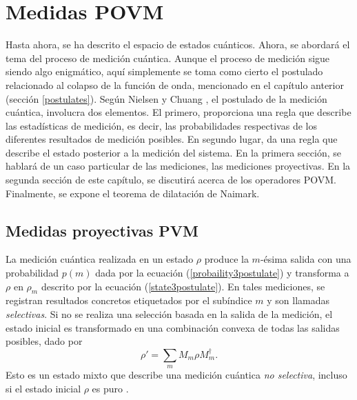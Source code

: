 \chapter{Medidas POVM}\label{MedidaPOVM}
Hasta ahora, se ha descrito el espacio de estados cuánticos. Ahora, se abordará
el tema del proceso de medición cuántica. Aunque el proceso de medición  sigue
siendo algo enigmático, aquí simplemente se toma como cierto el
postulado relacionado al colapso de la función de onda, mencionado en el capítulo
anterior (sección {\ref{postulates}}). Según Nielsen y Chuang
{\cite{nielsen_chuang_2010}}, el postulado de la medición cuántica, involucra
dos elementos. El primero, proporciona una regla que describe las estadísticas
de medición, es decir, las probabilidades respectivas de los diferentes
resultados de medición posibles. En segundo lugar, da una regla que describe el
estado posterior a la medición del sistema.  En la primera sección, se hablará
de un caso particular de las mediciones, las mediciones proyectivas. En la
segunda sección de este capítulo, se discutirá acerca de los operadores POVM\@.
Finalmente, se expone el teorema de dilatación de
Naimark. 

\section{Medidas proyectivas PVM} %
La medición cuántica realizada en un estado $\rho$ produce  la $m$-ésima 
salida con una probabilidad $p(m)$ dada por la ecuación
(\ref{probaility3postulate}) y transforma a $\rho $ en $\rho_m$ descrito por la
ecuación (\ref{state3postulate}). En tales mediciones, se registran resultados
concretos etiquetados por el subíndice $m$ y son llamadas \textit{selectivas}.
Si no se realiza una selección basada en la salida de la medición, el estado
inicial es transformado en una combinación convexa de todas las salidas
posibles, dado por 
\begin{equation}\label{non-selective-measure}
	\rho'=\sum_m M_m\rho M_m^\dagger.
\end{equation}
Esto es un estado mixto que  describe una medición cuántica \textit{no selectiva}, incluso si el estado inicial $\rho$ es puro {\cite{2007geometry}}.

